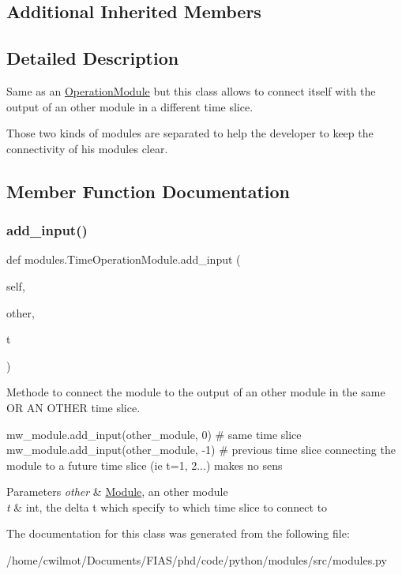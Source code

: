 \subsection*{Additional Inherited Members}


\subsection{Detailed Description}
Same as an \hyperlink{classmodules_1_1_operation_module}{Operation\+Module} but this class allows to connect itself with the output of an other module in a different time slice. 

Those two kinds of modules are separated to help the developer to keep the connectivity of his modules clear. 

\subsection{Member Function Documentation}
\mbox{\label{classmodules_1_1_time_operation_module_a3076a344fba6d85b134a6d4b5d2fba46}} 
\subsubsection{\texorpdfstring{add\+\_\+input()}{add\_input()}}
{\footnotesize\ttfamily def modules.\+Time\+Operation\+Module.\+add\+\_\+input (\begin{DoxyParamCaption}\item[{}]{self,  }\item[{}]{other,  }\item[{}]{t }\end{DoxyParamCaption})}



Methode to connect the module to the output of an other module in the same OR AN O\+T\+H\+ER time slice. 

mw\+\_\+module.\+add\+\_\+input(other\+\_\+module,  0) \# same time slice mw\+\_\+module.\+add\+\_\+input(other\+\_\+module, -\/1) \# previous time slice connecting the module to a future time slice (ie t=1, 2...) makes no sens 
\begin{DoxyParams}{Parameters}
{\em other} & \hyperlink{classmodules_1_1_module}{Module}, an other module \\
\hline
{\em t} & int, the delta t which specify to which time slice to connect to \\
\hline
\end{DoxyParams}


The documentation for this class was generated from the following file\+:\begin{DoxyCompactItemize}
\item 
/home/cwilmot/\+Documents/\+F\+I\+A\+S/phd/code/python/modules/src/modules.\+py\end{DoxyCompactItemize}
